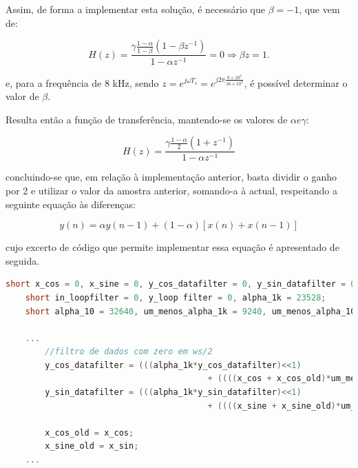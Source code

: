 \documentclass[11pt]{article}
\numberwithin{equation}{section}
\begin{document}
Assim, de forma a implementar esta solução, é necessário que $\beta = -1$, que vem de:

\vspace{-3mm}
\begin{equation}
H(z) = \frac{\gamma \frac{1-\alpha}{1-\beta} (1-\beta z^{-1})}{1-\alpha z^{-1}} = 0 \Rightarrow \beta z = 1.
\end{equation}

\vspace{1mm}
e, para a frequência de 8 kHz, sendo $z = e^{j\omega T_s} = e^{j2\pi \frac{8\times 10^3}{16\times 10^3}}$, é possível determinar o valor de $\beta$.
	
Resulta então a função de transferência, mantendo-se os valores de $\alpha e \gamma$:

\vspace{-3mm}
\begin{equation}
H(z) = \frac{\gamma \frac{1-\alpha}{2} (1+z^{-1})}{1-\alpha z^{-1}}
\end{equation}

\vspace{1mm}
concluindo-se que, em relação à implementação anterior, basta dividir o ganho por 2 e utilizar o valor da amostra anterior, somando-a à actual, respeitando a seguinte equação às diferenças:

\vspace{-3mm}
\begin{equation}
y(n) = \alpha y(n-1) +  (1-\alpha)[x(n) + x(n-1)]
\end{equation} 

\vspace{1mm}
cujo excerto de código que permite implementar essa equação é apresentado de seguida.

\begin{lstlisting}[language=C]
	short x_cos = 0, x_sine = 0, y_cos_datafilter = 0, y_sin_datafilter = 0;  
	short in_loopfilter = 0, y_loop filter = 0, alpha_1k = 23528; 
	short alpha_10 = 32640, um_menos_alpha_1k = 9240, um_menos_alpha_10 = 127;
	
	...
		//filtro de dados com zero em ws/2
		y_cos_datafilter = (((alpha_1k*y_cos_datafilter)<<1) 
										 + ((((x_cos + x_cos_old)*um_menos_alpha_1k)>>1)<<1))>>16;
		y_sin_datafilter = (((alpha_1k*y_sin_datafilter)<<1) 
										 + ((((x_sine + x_sine_old)*um_menos_alpha_1k)>>1)<<1))>>16;

		x_cos_old = x_cos;
		x_sine_old = x_sin;
	...
\end{lstlisting}
\end{document}
